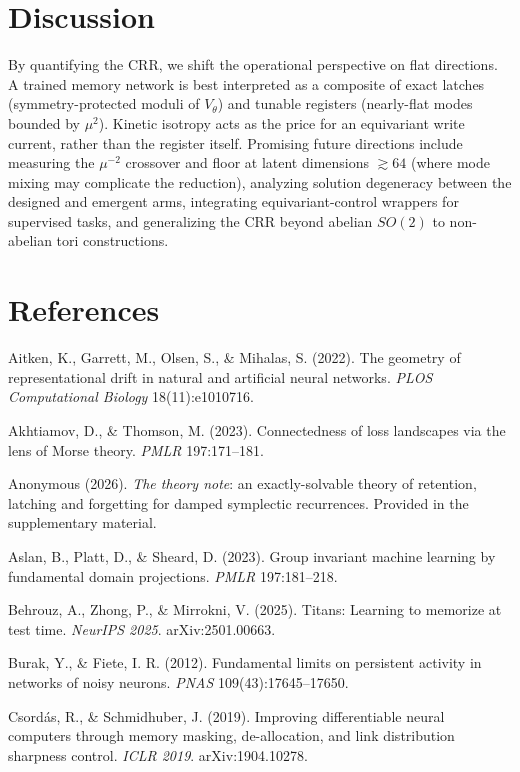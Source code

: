 \documentclass{article}
\begin{document}
\section{Discussion}\label{sec:discussion}

By quantifying the CRR, we shift the operational perspective on flat directions. A trained memory network is best interpreted as a composite of exact latches (symmetry-protected moduli of $V_\theta$) and tunable registers (nearly-flat modes bounded by $\mu^2$). Kinetic isotropy acts as the price for an equivariant write current, rather than the register itself. Promising future directions include measuring the $\mu^{-2}$ crossover and floor at latent dimensions $\gtrsim64$ (where mode mixing may complicate the reduction), analyzing solution degeneracy between the designed and emergent arms, integrating equivariant-control wrappers for supervised tasks, and generalizing the CRR beyond abelian $SO(2)$ to non-abelian tori constructions.

\section*{References}
\begingroup
\setlength{\parindent}{-0.22in}\setlength{\leftskip}{0.22in}\setlength{\parskip}{\smallskipamount}

Aitken, K., Garrett, M., Olsen, S., \& Mihalas, S. (2022). The geometry of representational drift in natural and artificial neural networks. \emph{PLOS Computational Biology} 18(11):e1010716.

Akhtiamov, D., \& Thomson, M. (2023). Connectedness of loss landscapes via the lens of Morse theory. \emph{PMLR} 197:171--181.

Anonymous (2026). \emph{The theory note}: an exactly-solvable theory of retention, latching and forgetting for damped symplectic recurrences. Provided in the supplementary material.

Aslan, B., Platt, D., \& Sheard, D. (2023). Group invariant machine learning by fundamental domain projections. \emph{PMLR} 197:181--218.

Behrouz, A., Zhong, P., \& Mirrokni, V. (2025). Titans: Learning to memorize at test time. \emph{NeurIPS 2025}. arXiv:2501.00663.

Burak, Y., \& Fiete, I. R. (2012). Fundamental limits on persistent activity in networks of noisy neurons. \emph{PNAS} 109(43):17645--17650.

Csord\'as, R., \& Schmidhuber, J. (2019). Improving differentiable neural computers through memory masking, de-allocation, and link distribution sharpness control. \emph{ICLR 2019}. arXiv:1904.10278.
\end{document}
